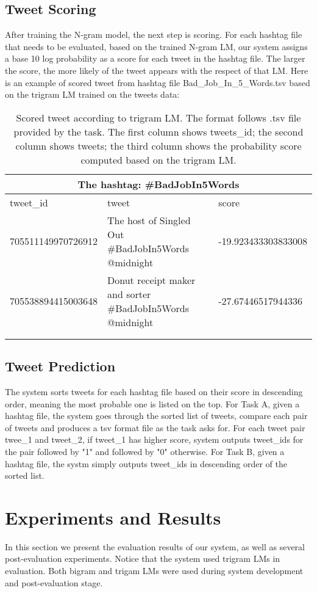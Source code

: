 \documentclass[11pt,a4paper]{article}
\begin{document}
\subsection{Tweet Scoring}
After training the N-gram model, the next step is scoring. For each hashtag file that needs to be evaluated, based on the trained N-gram LM, our system assigns a base 10 log probability as a score for each tweet in the hashtag file. The larger the score, the more likely of the tweet appears with the respect of that LM. Here is an example of scored tweet from hashtag file Bad\_Job\_In\_5\_Words.tsv based on the trigram LM trained on the tweets data:\\
\begin{table*}[h!]
\begin{tabular}{ |p{5cm}|p{5cm}|p{5cm}| } 
\hline
\multicolumn{3}{|c|}{The hashtag: \#BadJobIn5Words} \\
\hline
tweet\_id & tweet & score \\
\hline 
705511149970726912 & The host of Singled Out \#BadJobIn5Words @midnight & -19.923433303833008 \\
\hline
705538894415003648 & Donut receipt maker and sorter  \#BadJobIn5Words @midnight & -27.67446517944336 \\
\hline
\\
\caption{Scored tweet according to trigram LM. The format follows .tsv file provided by the task. The first column shows tweets\_id; the second column shows tweets; the third column shows the probability score computed based on the trigram LM. }
\label{table:2}
\end{tabular}
\end{table*}
\subsection{Tweet Prediction}
The system sorts tweets for each hashtag file based on their score in descending order, meaning the most probable one is listed on the top. For Task A, given a hashtag file, the system goes through the sorted list of tweets, compare each pair of tweets and produces a tsv format file as the task asks for. For each tweet pair twee\_1 and tweet\_2, if tweet\_1 has higher score, system outputs tweet\_ids for the pair followed by "1" and followed by "0" otherwise. For Task B, given a hashtag file, the systm simply outputs tweet\_ids in descending order of the sorted list. 


\section{Experiments and Results}
In this section we present the evaluation results of our system, as well as several post-evaluation experiments. Notice that the system used trigram LMs in evaluation. Both bigram and trigam LMs were used during system development and post-evaluation stage.
\end{document}
